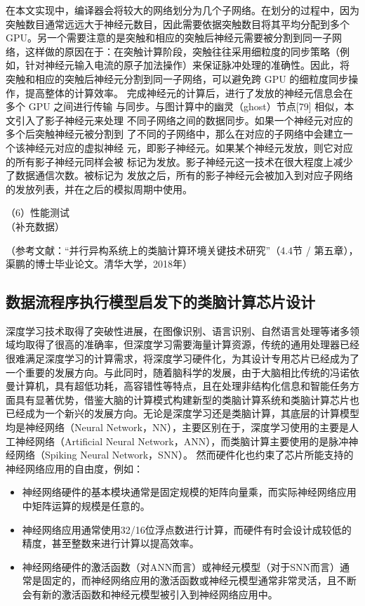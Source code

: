 在本文实现中，编译器会将较大的网络划分为几个子网络。在划分的过程中，因为突触数目通常远远大于神经元数目，因此需要依据突触数目将其平均分配到多个GPU。另一个需要注意的是突触和相应的突触后神经元需要被分割到同一子网络，这样做的原因在于：在突触计算阶段，突触往往采用细粒度的同步策略（例如，针对神经元输入电流的原子加法操作）来保证脉冲处理的准确性。因此，将 突触和相应的突触后神经元分割到同一子网络，可以避免跨 GPU 的细粒度同步操 作，提高整体的计算效率。 完成神经元的计算后，进行了发放的神经元信息会在多个 GPU 之间进行传输 与同步。与图计算中的幽灵（ghost）节点[79] 相似，本文引入了影子神经元来处理 不同子网络之间的数据同步。如果一个神经元对应的多个后突触神经元被分割到 了不同的子网络中，那么在对应的子网络中会建立一个该神经元对应的虚拟神经 元，即影子神经元。如果某个神经元发放，则它对应的所有影子神经元同样会被 标记为发放。影子神经元这一技术在很大程度上减少了数据通信次数。被标记为 发放之后，所有的影子神经元会被加入到对应子网络的发放列表，并在之后的模拟周期中使用。

（6）性能测试\\

（补充数据）

（参考文献：“并行异构系统上的类脑计算环境关键技术研究”（4.4节 / 第五章），渠鹏的博士毕业论文。清华大学，2018年）

\subsection{数据流程序执行模型启发下的类脑计算芯片设计} 
深度学习技术取得了突破性进展，在图像识别、语言识别、自然语言处理等诸多领域均取得了很高的准确率，但深度学习需要海量计算资源，传统的通用处理器已经很难满足深度学习的计算需求，将深度学习硬件化，为其设计专用芯片已经成为了一个重要的发展方向。与此同时，随着脑科学的发展，由于大脑相比传统的冯诺依曼计算机，具有超低功耗，高容错性等特点，且在处理非结构化信息和智能任务方面具有显著优势，借鉴大脑的计算模式构建新型的类脑计算系统和类脑计算芯片也已经成为一个新兴的发展方向。无论是深度学习还是类脑计算，其底层的计算模型均是神经网络（Neural Network，NN），主要区别在于，深度学习使用的主要是人工神经网络（Artificial Neural Network，ANN），而类脑计算主要使用的是脉冲神经网络（Spiking Neural Network，SNN）。
然而硬件化也约束了芯片所能支持的神经网络应用的自由度，例如：
\begin{itemize}
    \item 神经网络硬件的基本模块通常是固定规模的矩阵向量乘，而实际神经网络应用中矩阵运算的规模是任意的。
    \item 神经网络应用通常使用32/16位浮点数进行计算，而硬件有时会设计成较低的精度，甚至整数来进行计算以提高效率。
    \item 神经网络硬件的激活函数（对ANN而言）或神经元模型（对于SNN而言）通常是固定的，而神经网络应用的激活函数或神经元模型通常非常灵活，且不断会有新的激活函数和神经元模型被引入到神经网络应用中。
\end{itemize}


